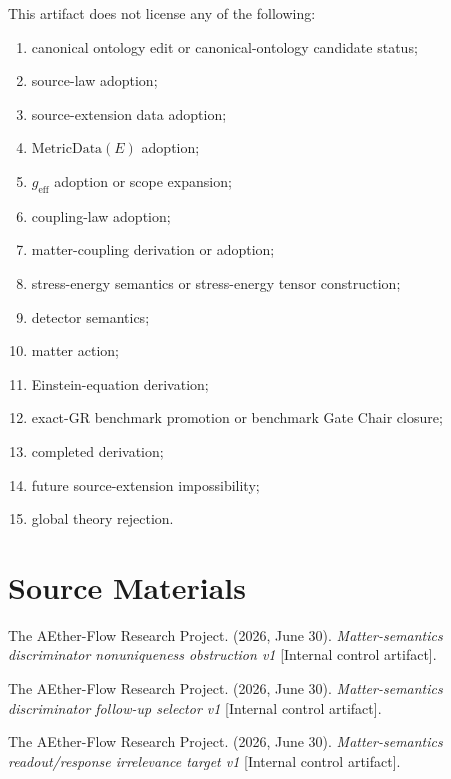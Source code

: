 This artifact does not license any of the following:
\begin{enumerate}
  \item canonical ontology edit or canonical-ontology candidate status;
  \item source-law adoption;
  \item source-extension data adoption;
  \item \(\mathrm{MetricData}(E)\) adoption;
  \item \(g_{\mathrm{eff}}\) adoption or scope expansion;
  \item coupling-law adoption;
  \item matter-coupling derivation or adoption;
  \item stress-energy semantics or stress-energy tensor construction;
  \item detector semantics;
  \item matter action;
  \item Einstein-equation derivation;
  \item exact-GR benchmark promotion or benchmark Gate Chair closure;
  \item completed derivation;
  \item future source-extension impossibility;
  \item global theory rejection.
\end{enumerate}

\section{Source Materials}

The AEther-Flow Research Project. (2026, June 30). \emph{Matter-semantics
discriminator nonuniqueness obstruction v1} [Internal control artifact].

The AEther-Flow Research Project. (2026, June 30). \emph{Matter-semantics
discriminator follow-up selector v1} [Internal control artifact].

The AEther-Flow Research Project. (2026, June 30). \emph{Matter-semantics
readout/response irrelevance target v1} [Internal control artifact].
